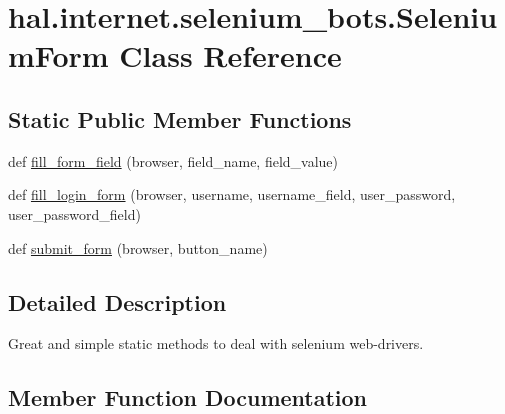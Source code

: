 \hypertarget{classhal_1_1internet_1_1selenium__bots_1_1_selenium_form}{}\section{hal.\+internet.\+selenium\+\_\+bots.\+Selenium\+Form Class Reference}
\label{classhal_1_1internet_1_1selenium__bots_1_1_selenium_form}
\subsection*{Static Public Member Functions}
\begin{DoxyCompactItemize}
\item 
def \hyperlink{classhal_1_1internet_1_1selenium__bots_1_1_selenium_form_ac5b407648f6f5fd8ae374114f1249b06}{fill\+\_\+form\+\_\+field} (browser, field\+\_\+name, field\+\_\+value)
\item 
def \hyperlink{classhal_1_1internet_1_1selenium__bots_1_1_selenium_form_a4fa797cec8b928267a6242ffccee5887}{fill\+\_\+login\+\_\+form} (browser, username, username\+\_\+field, user\+\_\+password, user\+\_\+password\+\_\+field)
\item 
def \hyperlink{classhal_1_1internet_1_1selenium__bots_1_1_selenium_form_a4573be4686c58856ee6244926e45f7d9}{submit\+\_\+form} (browser, button\+\_\+name)
\end{DoxyCompactItemize}


\subsection{Detailed Description}
\begin{DoxyVerb}Great and simple static methods to deal with selenium web-drivers. \end{DoxyVerb}
 

\subsection{Member Function Documentation}
